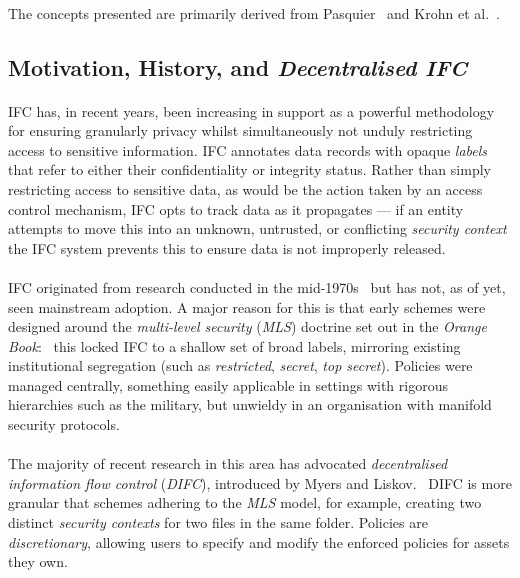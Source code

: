 \paragraph{} The concepts presented are primarily derived from Pasquier~\cite{camflow} and Krohn et al.~\cite{flume}.

\subsection{Motivation, History, and \textit{Decentralised IFC}}

\paragraph{} IFC has, in recent years, been increasing in support as a powerful methodology for ensuring granularly privacy whilst simultaneously not unduly restricting access to sensitive information. IFC annotates data records with opaque \textit{labels} that refer to either their confidentiality or integrity status. Rather than simply restricting access to sensitive data, as would be the action taken by an access control mechanism, IFC opts to track data as it propagates --- if an entity attempts to move this into an unknown, untrusted, or conflicting \textit{security context} the IFC system prevents this to ensure data is not improperly released.

\paragraph{} IFC originated from research conducted in the mid-1970s~\cite{ifc-lattice} but has not, as of yet, seen mainstream adoption. A major reason for this is that early schemes were designed around the \textit{multi-level security} (\textit{MLS}) doctrine set out in the \textit{Orange Book}:~\cite{orange-book} this locked IFC to a shallow set of broad labels, mirroring existing institutional segregation (such as \textit{restricted}, \textit{secret}, \textit{top secret}). Policies were managed centrally, something easily applicable in settings with rigorous hierarchies such as the military, but unwieldy in an organisation with manifold security protocols.

\paragraph{} The majority of recent research in this area has advocated \textit{decentralised information flow control} 
(\textit{DIFC}), introduced by Myers and Liskov.~\cite{difc,10.1145/363516.363526,10.1145/268998.266669} DIFC is more granular that schemes adhering to the \textit{MLS} model, for example, creating two distinct \textit{security contexts} for two files in the same folder. Policies are \textit{discretionary}, allowing users to specify and modify the enforced policies for assets they own.

